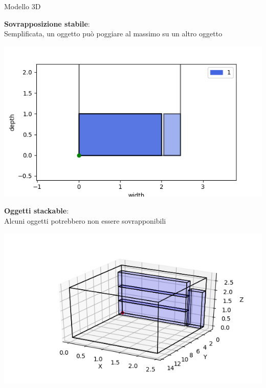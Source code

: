 \documentclass{beamer}
\begin{document}
\begin{frame}{Modello 3D}
	\begin{minipage}[c]{0.45\textwidth}
		\textbf{Sovrapposizione stabile}:\\ Semplificata, un oggetto pu\`o poggiare al massimo su un altro oggetto
	\end{minipage}
	\hfill
	\begin{minipage}[c]{0.45\textwidth}
		\includegraphics[width=1\linewidth]{figures/3dg}
	\end{minipage}
			
	\begin{minipage}[c]{0.45\textwidth}
		\textbf{Oggetti stackable}:\\ Alcuni oggetti potrebbero non essere sovrapponibili
	\end{minipage}
	\hfill
	\begin{minipage}[c]{0.45\textwidth}
		\includegraphics[width=1\linewidth]{figures/3d}
	\end{minipage}
\end{frame}
\end{document}
